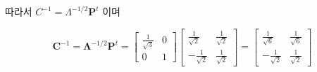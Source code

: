 \documentclass[
  11pt,
  a4paper,
  oneside]{scrbook}
\theoremstyle{definition}
\theoremstyle{plain}
\theoremstyle{definition}
\theoremstyle{definition}
\theoremstyle{remark}
\begin{document}
따라서 \(C^{-1} =  \Lambda^{-1/2} \pmb P^t\) 이며

\[
\pmb C^{-1} =
  \pmb \Lambda^{-1/2} \pmb P^t =
  \begin{bmatrix}
\frac{1}{\sqrt{3}} & 0\\
0 & 1
\end{bmatrix}
\begin{bmatrix}
\frac{1}{\sqrt{2}} & \frac{1}{\sqrt{2}}\\
-\frac{1}{\sqrt{2}} & \frac{1}{\sqrt{2}}
\end{bmatrix}
=
  \begin{bmatrix}
\frac{1}{\sqrt{6}} & \frac{1}{\sqrt{6}}\\
-\frac{1}{\sqrt{2}} & \frac{1}{\sqrt{2}}
\end{bmatrix}
\]


\backmatter
\end{document}
